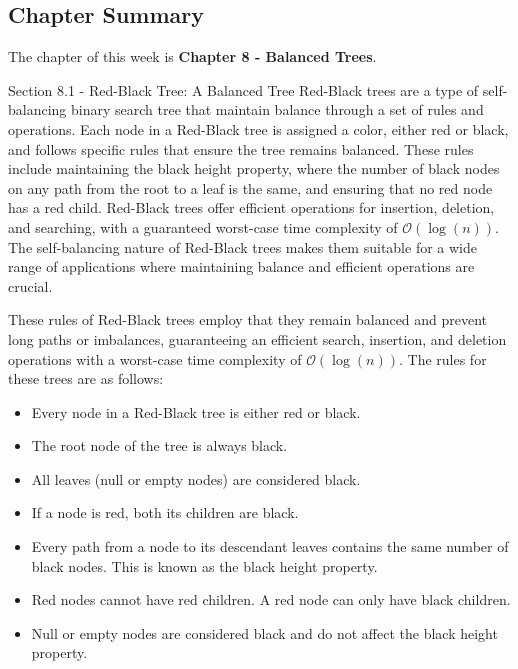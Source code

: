 \subsection{Chapter Summary}

The chapter of this week is \textbf{Chapter 8 - Balanced Trees}.

\begin{notes}{Section 8.1 - Red-Black Tree: A Balanced Tree}
    Red-Black trees are a type of self-balancing binary search tree that maintain balance through a set of rules and operations. Each node in a Red-Black tree is assigned a color, either red or black, and follows specific rules that ensure the tree remains balanced. These rules include maintaining the black height property, where the number of black 
    nodes on any path from the root to a leaf is the same, and ensuring that no red node has a red child. Red-Black trees offer efficient operations for insertion, deletion, and searching, with a guaranteed worst-case time complexity of $\mathcal{O}(\log{(n)})$. The self-balancing nature of Red-Black trees makes them suitable for a wide range of applications where 
    maintaining balance and efficient operations are crucial.
    
    These rules of Red-Black trees employ that they remain balanced and prevent long paths or imbalances, guaranteeing an efficient search, insertion, and deletion operations with a worst-case time complexity of $\mathcal{O}(\log{(n)})$. The rules for these trees are as follows:
    
    \begin{itemize}
        \item Every node in a Red-Black tree is either red or black.
        \item The root node of the tree is always black.
        \item All leaves (null or empty nodes) are considered black.
        \item If a node is red, both its children are black.
        \item Every path from a node to its descendant leaves contains the same number of black nodes. This is known as the black height property.
        \item Red nodes cannot have red children. A red node can only have black children.
        \item Null or empty nodes are considered black and do not affect the black height property.
    \end{itemize}
\end{notes}

